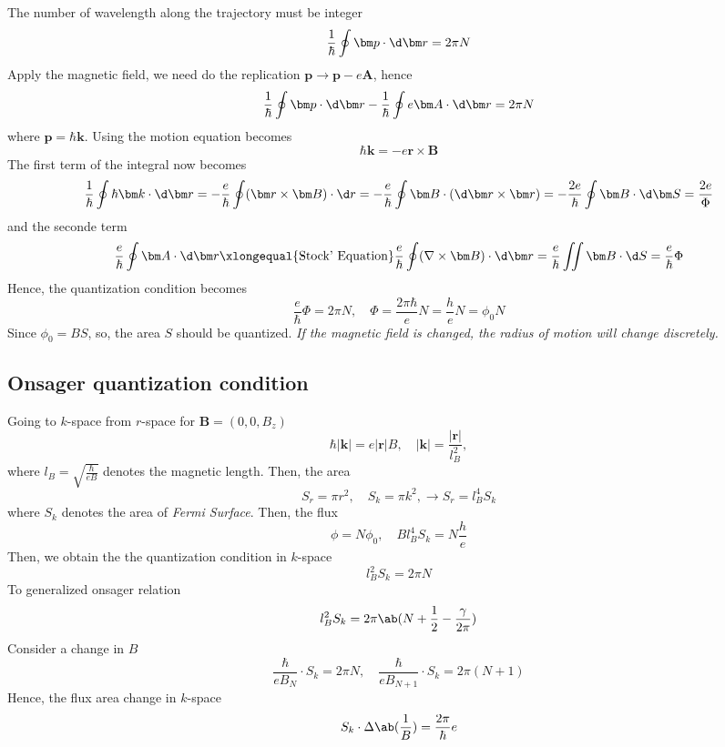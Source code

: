 The number of wavelength along the trajectory must be integer
\begin{equation}
  \frac1\hbar \oint \bm p \cdot \d\bm r = 2\pi N
\end{equation}
Apply the magnetic field, we need do the replication $\bm p \to \bm p - e\bm A$,
hence
\begin{equation}
  \frac1\hbar \oint \bm p \cdot \d\bm r - \frac1\hbar \oint e\bm A \cdot \d\bm r
= 2\pi N
\end{equation}
where $\bm p = \hbar\bm k$. Using the motion equation becomes
\begin{equation}
  \hbar\bm k = -e\bm r \times \bm B
\end{equation}
The first term of the integral now becomes
\[
  \frac1\hbar \oint \hbar \bm k \cdot \d\bm r
= -\frac e\hbar \oint(\bm r \times \bm B) \cdot \d r
= -\frac e\hbar \oint \bm B \cdot(\d\bm r \times \bm r) = -\frac{2e}{\hbar} \oint \bm B \cdot \d\bm S = \frac{2e}{\Phi}
\]
and the seconde term
\[
  \frac e\hbar \oint \bm A \cdot \d \bm r \xlongequal{\text{Stock' Equation}}
  \frac e\hbar \oint (\nabla \times \bm B) \cdot \d\bm r
= \frac e\hbar \iint \bm B \cdot \d S = \frac e\hbar \Phi
\]
Hence, the quantization condition becomes
\begin{equation}
  \frac e\hbar \Phi = 2\pi N, \quad \Phi = \frac{2\pi\hbar}{e}N
= \frac he N = \phi_0N
\end{equation}
Since $\phi_0 = BS$, so, the area $S$ should be quantized.
\emph{If the magnetic field is changed, the radius of motion will change
  discretely.}

\subsection{Onsager quantization condition}

Going to $k$-space from $r$-space for $\bm B = (0,0,B_z)$
\[
  \hbar|\bm k| = e|\bm r| B, \quad |\bm k| = \frac{|\bm r|}{l_B^2},
\]
where $l_B = \sqrt{\frac\hbar{eB}}$ denotes the magnetic length.
Then, the area
\[
  S_r = \pi r^2, \quad S_k = \pi k^2, \to S_r = l_B^4 S_k
\]
where $S_k$ denotes the area of \emph{Fermi Surface}. Then, the flux
\[
  \phi = N\phi_0, \quad B l_B^4 S_k = N\frac he
\]
Then, we obtain the the quantization condition in $k$-space
\begin{equation}
  l_B^2 S_k = 2\pi N
\end{equation}
To generalized onsager relation
\[
  l_B^2 S_k = 2\pi\ab(N + \frac12 - \frac\gamma{2\pi})
\]
Consider a change in $B$
\[
  \frac\hbar{eB_N} \cdot S_k = 2\pi N, \quad
  \frac\hbar{eB_{N+1}} \cdot S_k = 2\pi (N + 1)
\]
Hence, the flux area change in $k$-space
\begin{equation}
  S_k \cdot \Delta\ab(\frac1B) = \frac{2\pi}{\hbar} e
\end{equation}

